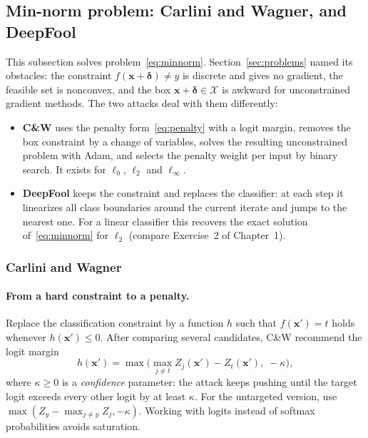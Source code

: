 \documentclass[10pt,a4paper]{extarticle}
\theoremstyle{definition}
\newcommand{\X}{\mathcal{X}}
\newcommand{\x}{\mathbf{x}}
\newcommand{\xadv}{\mathbf{x}'}
\newcommand{\bdelta}{\boldsymbol{\delta}}
\begin{document}
\subsection{Min-norm problem: Carlini and Wagner, and DeepFool}\label{sec:minnorm}

This subsection solves problem~\eqref{eq:minnorm}. Section~\ref{sec:problems} named its obstacles: the constraint \(f(\x+\bdelta)\neq y\) is discrete and gives no gradient, the feasible set is nonconvex, and the box \(\x+\bdelta\in\X\) is awkward for unconstrained gradient methods. The two attacks deal with them differently:
\begin{itemize}
  \item \textbf{C\&W} \citep{carlini2017towards} uses the penalty form~\eqref{eq:penalty} with a logit margin, removes the box constraint by a change of variables, solves the resulting unconstrained problem with Adam, and selects the penalty weight per input by binary search. It exists for \(\ell_0\), \(\ell_2\) and \(\ell_\infty\).
  \item \textbf{DeepFool} \citep{moosavi2016deepfool} keeps the constraint and replaces the classifier: at each step it linearizes all class boundaries around the current iterate and jumps to the nearest one. For a linear classifier this recovers the exact solution of~\eqref{eq:minnorm} for \(\ell_2\) (compare Exercise~2 of Chapter~1).
\end{itemize}

\subsubsection{Carlini and Wagner}\label{sec:cw}

\paragraph{From a hard constraint to a penalty.} Replace the classification constraint by a function \(h\) such that \(f(\xadv)=t\) holds whenever \(h(\xadv)\le0\). After comparing several candidates, C\&W recommend the logit margin
\begin{equation}\label{eq:cwloss}
h(\xadv) = \max\Big(\max_{j\neq t} Z_j(\xadv) - Z_t(\xadv),\; -\kappa\Big),
\end{equation}
where \(\kappa\ge0\) is a \emph{confidence} parameter: the attack keeps pushing until the target logit exceeds every other logit by at least \(\kappa\). For the untargeted version, use \(\max(Z_y - \max_{j\neq y}Z_j, -\kappa)\). Working with logits instead of softmax probabilities avoids saturation.
\end{document}
